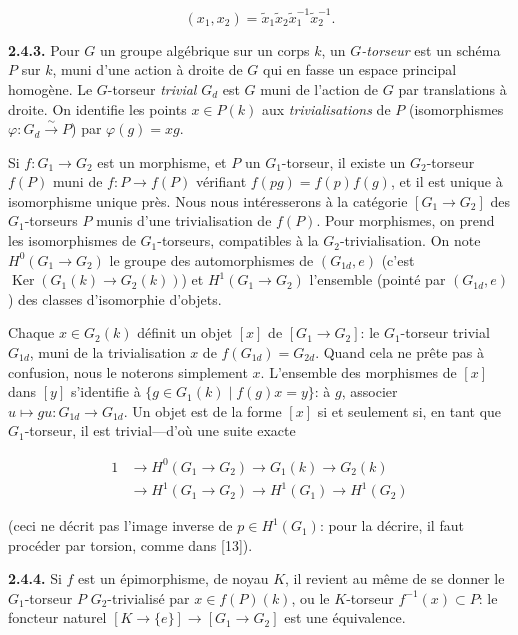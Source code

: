 \documentclass[10pt,a4paper]{article}
\begin{document}
\[
(x_1,x_2)=\widetilde x_1\widetilde x_2\widetilde x_1^{-1}\widetilde x_2^{-1}.
\]

\textbf{2.4.3.} Pour \(G\) un groupe algébrique sur un corps \(k\), un \emph{\(G\)-torseur} est un schéma \(P\) sur \(k\), muni d'une action à droite de \(G\) qui en fasse un espace principal homogène. Le \(G\)-torseur \emph{trivial} \(G_d\) est \(G\) muni de l'action de \(G\) par translations à droite. On identifie les points \(x\in P(k)\) aux \emph{trivialisations} de \(P\) (isomorphismes \(\varphi:G_d\xrightarrow{\sim}P\)) par \(\varphi(g)=xg\).

Si \(f:G_1\to G_2\) est un morphisme, et \(P\) un \(G_1\)-torseur, il existe un \(G_2\)-torseur \(f(P)\) muni de \(f:P\to f(P)\) vérifiant \(f(pg)=f(p)f(g)\), et il est unique à isomorphisme unique près. Nous nous intéresserons à la catégorie \([G_1\to G_2]\) des \(G_1\)-torseurs \(P\) munis d'une trivialisation de \(f(P)\). Pour morphismes, on prend les isomorphismes de \(G_1\)-torseurs, compatibles à la \(G_2\)-trivialisation. On note \(H^0(G_1\to G_2)\) le groupe des automorphismes de \((G_{1d},e)\) (c'est \(\operatorname{Ker}(G_1(k)\to G_2(k))\)) et \(H^1(G_1\to G_2)\) l'ensemble (pointé par \((G_{1d},e)\)) des classes d'isomorphie d'objets.

Chaque \(x\in G_2(k)\) définit un objet \([x]\) de \([G_1\to G_2]\): le \(G_1\)-torseur trivial \(G_{1d}\), muni de la trivialisation \(x\) de \(f(G_{1d})=G_{2d}\). Quand cela ne prête pas à confusion, nous le noterons simplement \(x\). L'ensemble des morphismes de \([x]\) dans \([y]\) s'identifie à \(\{g\in G_1(k)\mid f(g)x=y\}\): à \(g\), associer \(u\mapsto gu:G_{1d}\to G_{1d}\). Un objet est de la forme \([x]\) si et seulement si, en tant que \(G_1\)-torseur, il est trivial---d'où une suite exacte

\[
\tag{2.4.3.1}
\begin{aligned}
1&\longrightarrow H^0(G_1\longrightarrow G_2)\longrightarrow G_1(k)\longrightarrow G_2(k)\\
 &\longrightarrow H^1(G_1\longrightarrow G_2)\longrightarrow H^1(G_1)\longrightarrow H^1(G_2)
\end{aligned}
\]

(ceci ne décrit pas l'image inverse de \(p\in H^1(G_1)\): pour la décrire, il faut procéder par torsion, comme dans {[}13{]}).

\textbf{2.4.4.} Si \(f\) est un épimorphisme, de noyau \(K\), il revient au même de se donner le \(G_1\)-torseur \(P\) \(G_2\)-trivialisé par \(x\in f(P)(k)\), ou le \(K\)-torseur \(f^{-1}(x)\subset P\): le foncteur naturel \([K\to\{e\}]\to[G_1\to G_2]\) est une équivalence.
\end{document}
